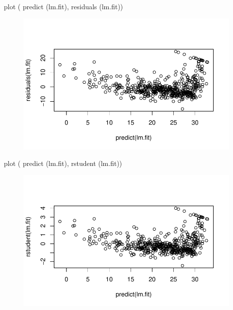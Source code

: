 \documentclass[
  letterpaper,
  DIV=11,
  numbers=noendperiod]{scrartcl}
\newenvironment{Shaded}{\begin{snugshade}}{\end{snugshade}}
\newcommand{\FunctionTok}[1]{\textcolor[rgb]{0.28,0.35,0.67}{#1}}
\newcommand{\NormalTok}[1]{\textcolor[rgb]{0.00,0.23,0.31}{#1}}
\begin{document}
\begin{Shaded}
\begin{Highlighting}[]
\FunctionTok{plot}\NormalTok{ ( }\FunctionTok{predict}\NormalTok{ (lm.fit), }\FunctionTok{residuals}\NormalTok{ (lm.fit))}
\end{Highlighting}
\end{Shaded}

\begin{figure}[H]

{\centering \includegraphics{Regresion-lineal-simple-y-multiple_files/figure-pdf/unnamed-chunk-14-1.pdf}

}

\end{figure}

\begin{Shaded}
\begin{Highlighting}[]
\FunctionTok{plot}\NormalTok{ ( }\FunctionTok{predict}\NormalTok{ (lm.fit), }\FunctionTok{rstudent}\NormalTok{ (lm.fit))}
\end{Highlighting}
\end{Shaded}

\begin{figure}[H]

{\centering \includegraphics{Regresion-lineal-simple-y-multiple_files/figure-pdf/unnamed-chunk-14-2.pdf}

}

\end{figure}
\end{document}
